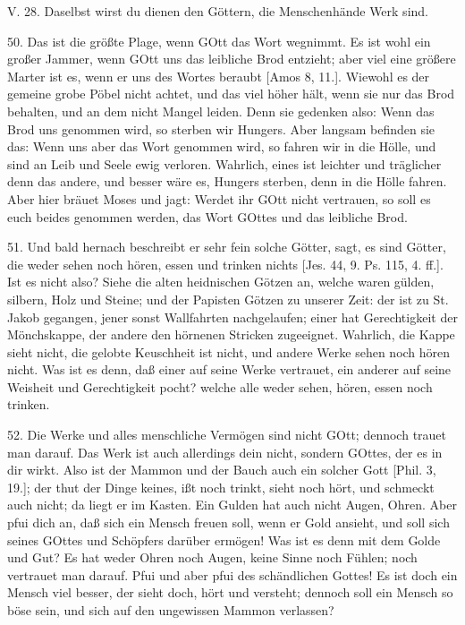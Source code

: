 \begin{schriftzitat}
V. 28. Daselbst wirst du dienen den Göttern, die Menschenhände Werk sind.
\end{schriftzitat}

50. Das ist die größte Plage, wenn GOtt das Wort wegnimmt. Es ist wohl ein großer Jammer, wenn GOtt uns das leibliche Brod entzieht; aber viel eine größere Marter ist es, wenn er uns des Wortes beraubt [Amos 8, 11.]. Wiewohl es der gemeine grobe Pöbel nicht achtet, und das viel höher hält, wenn sie nur das Brod behalten, und an dem nicht Mangel leiden. Denn sie gedenken also: Wenn das Brod uns genommen wird, so sterben wir Hungers. Aber langsam befinden sie das: Wenn uns aber das Wort genommen wird, so fahren wir in die Hölle, und sind an Leib und Seele ewig verloren. Wahrlich, eines ist leichter und träglicher denn das andere, und besser wäre es, Hungers sterben, denn in die Hölle fahren. Aber hier bräuet Moses und jagt: Werdet ihr GOtt nicht vertrauen, so soll es euch beides genommen werden, das Wort GOttes und das leibliche Brod.

51. Und bald hernach beschreibt er sehr fein solche Götter, sagt, es sind Götter, die weder sehen noch hören, essen und trinken nichts [Jes. 44, 9. Ps. 115, 4. ff.]. Ist es nicht also? Siehe die alten heidnischen Götzen an, welche waren gülden, silbern, Holz und Steine; und der Papisten Götzen zu unserer Zeit: der ist zu St. Jakob gegangen, jener sonst Wallfahrten nachgelaufen; einer hat Gerechtigkeit der Mönchskappe, der andere den hörnenen Stricken zugeeignet. Wahrlich, die Kappe sieht nicht, die gelobte Keuschheit ist nicht, und andere Werke sehen noch hören nicht. Was ist es denn, daß einer auf seine Werke vertrauet, ein anderer auf seine Weisheit und Gerechtigkeit pocht? welche alle weder sehen, hören, essen noch trinken.

52. Die Werke und alles menschliche Vermögen sind nicht GOtt; dennoch trauet man darauf. Das Werk ist auch allerdings dein nicht, sondern GOttes, der es in dir wirkt. Also ist der Mammon und der Bauch auch ein solcher Gott [Phil. 3, 19.]; der thut der Dinge keines, ißt noch trinkt, sieht noch hört, und schmeckt auch nicht; da liegt er im Kasten. Ein Gulden hat auch nicht Augen, Ohren. Aber pfui dich an, daß sich ein Mensch freuen soll, wenn er Gold ansieht, und soll sich seines GOttes und Schöpfers darüber ermögen! Was ist es denn mit dem Golde und Gut? Es hat weder Ohren noch Augen, keine Sinne noch Fühlen; noch vertrauet man darauf. Pfui und aber pfui des
schändlichen Gottes! Es ist doch ein Mensch viel besser, der sieht doch, hört und versteht; dennoch soll ein Mensch so böse sein, und sich auf den ungewissen Mammon verlassen?

